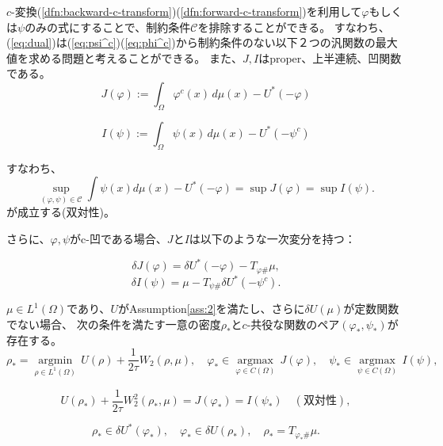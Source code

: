 $c$-変換(\ref{dfn:backward-c-transform})(\ref{dfn:forward-c-transform})を利用して$\varphi$もしくは$\psi$のみの式にすることで、制約条件$\mathcal{C}$を排除することができる。
すなわち、(\ref{eq:dual})は(\ref{eq:psi^c})(\ref{eq:phi^c})から制約条件のない以下２つの汎関数の最大値を求める問題と考えることができる。
また、$J,I$はproper、上半連続、凹関数である。
\begin{equation}
    \label{eq:J}
    J(\varphi):= \int_{\Omega} \varphi^c(x) \,d\mu(x) - U^*(- \varphi)
\end{equation}

\begin{equation}
    \label{eq:I}
    I(\psi):= \int_{\Omega} \psi(x) \, d\mu(x) - U^*(- \psi^{c})
\end{equation}

すなわち、
\[
\sup_{(\varphi,\psi) \in \mathcal{C}} \int \psi(x) d\mu(x) - U^*(- \varphi) = \sup J(\varphi) = \sup I(\psi).
\]
が成立する(双対性)。

さらに、$\varphi, \psi$がc-凹である場合、$J$と$I$は以下のような一次変分を持つ：

\begin{equation}
    \label{eq:delta J}
    \delta J(\varphi) = \delta U^*(- \varphi) - T_{\varphi \#} \mu,
\end{equation}
\begin{equation}
    \label{eq:delta I}
    \delta I(\psi) = \mu - T_{\psi \#} \delta U^* (- \psi^c).
\end{equation}

\begin{thm}
    \label{thm: duality}
        $\mu \in L^1(\Omega)$であり、$U$がAssumption\ref{ass:2}を満たし、さらに$\delta U(\mu)$が定数関数でない場合、
        次の条件を満たす一意の密度$\rho_*$と$c$-共役な関数のペア$(\varphi_*, \psi_*)$が存在する。
    \begin{equation*}
        \rho_* = \underset{\rho \in L^1(\Omega)} {\operatorname{argmin}} \, U(\rho) + \frac{1}{2\tau} W_2(\rho, \mu), \quad \varphi_* \in \underset{\varphi \in C(\Omega)} {\operatorname{argmax}} \, J(\varphi), \quad \psi_* \in \underset{\psi \in C(\Omega)} {\operatorname{argmax}} \, I(\psi),
    \end{equation*}
    
    \begin{equation*}
    U(\rho_*) + \frac{1}{2\tau} W_2^2(\rho_*,\mu) = J(\varphi_*) = I(\psi_*) \quad (\text{双対性}), 
    \end{equation*}
    
    \begin{equation*}
        \rho_* \in \delta U^*(\varphi_*), \quad \varphi_* \in \delta U(\rho_*), \quad \rho_* = T_{\varphi_* \#} \mu.
    \end{equation*}
    \end{thm}



